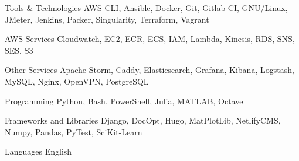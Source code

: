 

\begin{cvskills}

  \cvskill
    {Tools \& Technologies} %
    {AWS-CLI, Ansible, Docker, Git, Gitlab CI, GNU/Linux, JMeter, Jenkins, Packer, Singularity, Terraform, Vagrant} %

  \cvskill
    {AWS Services} %
    {Cloudwatch, EC2, ECR, ECS, IAM, Lambda, Kinesis, RDS, SNS, SES, S3} %

  \cvskill
    {Other Services} %
    {Apache Storm, Caddy, Elasticsearch, Grafana, Kibana, Logstash, MySQL, Nginx, OpenVPN, PostgreSQL} %

  \cvskill
    {Programming} %
    {Python, Bash, PowerShell, Julia, MATLAB, Octave} %

  \cvskill
    {Frameworks and Libraries} %
    {Django, DocOpt, Hugo, MatPlotLib, NetlifyCMS, Numpy, Pandas, PyTest, SciKit-Learn} %

  \cvskill
    {Languages} %
    {English} %

\end{cvskills}
